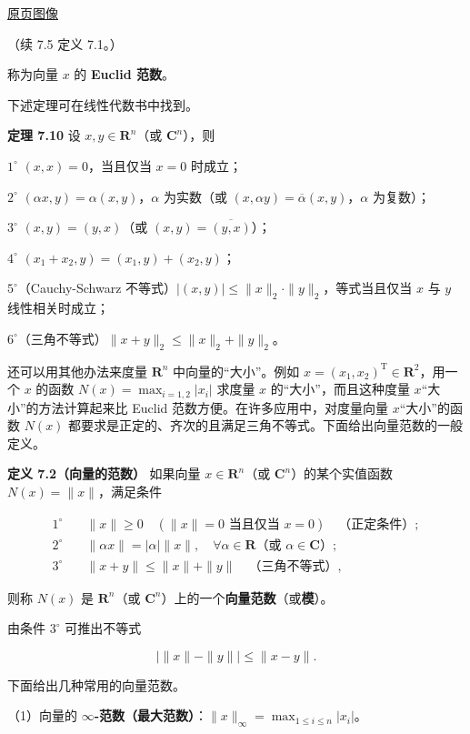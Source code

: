 \href{source-images/pdf-200.jpeg}{原页图像}

（续 7.5 定义 7.1。）

称为向量 \(x\) 的 \textbf{Euclid 范数}。

下述定理可在线性代数书中找到。

\textbf{定理 7.10} 设 \(x,y\in\mathbf R^n\)（或 \(\mathbf C^n\)），则

\(1^\circ\) \((x,x)=0\)，当且仅当 \(x=0\) 时成立；

\(2^\circ\) \((\alpha x,y)=\alpha(x,y)\)，\(\alpha\) 为实数（或 \((x,\alpha y)=\overline\alpha(x,y)\)，\(\alpha\) 为复数）；

\(3^\circ\) \((x,y)=(y,x)\)（或 \((x,y)=\overline{(y,x)}\)）；

\(4^\circ\) \((x_1+x_2,y)=(x_1,y)+(x_2,y)\)；

\(5^\circ\)（Cauchy-Schwarz 不等式）\(|(x,y)|\leqslant\|x\|_2\cdot\|y\|_2\)，等式当且仅当 \(x\) 与 \(y\) 线性相关时成立；

\(6^\circ\)（三角不等式）\(\|x+y\|_2\leqslant\|x\|_2+\|y\|_2\)。

还可以用其他办法来度量 \(\mathbf R^n\) 中向量的``大小''。例如 \(x=(x_1,x_2)^{\mathrm T}\in\mathbf R^2\)，用一个 \(x\) 的函数 \(N(x)=\max_{i=1,2}|x_i|\) 求度量 \(x\) 的``大小''，而且这种度量 \(x\)``大小''的方法计算起来比 Euclid 范数方便。在许多应用中，对度量向量 \(x\)``大小''的函数 \(N(x)\) 都要求是正定的、齐次的且满足三角不等式。下面给出向量范数的一般定义。

\textbf{定义 7.2（向量的范数）} 如果向量 \(x\in\mathbf R^n\)（或 \(\mathbf C^n\)）的某个实值函数 \(N(x)=\|x\|\)，满足条件

\[
\begin{aligned}
1^\circ\quad &\|x\|\geqslant0\quad(\|x\|=0\text{ 当且仅当 }x=0)\quad\text{（正定条件）};\\
2^\circ\quad &\|\alpha x\|=|\alpha|\|x\|,\quad\forall\alpha\in\mathbf R\text{（或 }\alpha\in\mathbf C\text{）};\\
3^\circ\quad &\|x+y\|\leqslant\|x\|+\|y\|\quad\text{（三角不等式）},
\end{aligned}
\tag{7.5.1}
\]

则称 \(N(x)\) 是 \(\mathbf R^n\)（或 \(\mathbf C^n\)）上的一个\textbf{向量范数}（或\textbf{模}）。

由条件 \(3^\circ\) 可推出不等式

\[
\big|\|x\|-\|y\|\big|\leqslant\|x-y\|.
\tag{7.5.2}
\]

下面给出几种常用的向量范数。

（1）向量的 \textbf{\(\infty\)-范数（最大范数）}：\(\|x\|_\infty=\max_{1\leqslant i\leqslant n}|x_i|\)。

